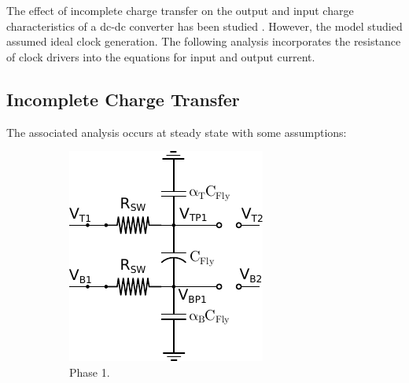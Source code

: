 \documentclass[conference]{IEEEtran}
\begin{document}
	
	The effect of incomplete charge transfer on the output and input charge characteristics of a dc-dc converter has been studied \cite{Tanzawa2011}. However, the model studied assumed ideal clock generation. The following analysis incorporates the resistance of clock drivers into the equations for input and output current. 
	
	\subsection{Incomplete Charge Transfer}
	The associated analysis occurs at steady state with some assumptions:
	
	\begin{figure}
		\begin{subfigure}{0.43\linewidth}
			\centering
			\includegraphics[width=\linewidth]{Figures/Phase1EQ.pdf}
			\caption{Phase 1.}
			\label{Fig:Phase1EQ}
		\end{subfigure}
		\hfill
		\begin{subfigure}{0.43\linewidth}
			\centering

\end{subfigure}
\end{figure}
\end{document}
